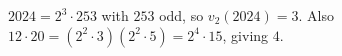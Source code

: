 $ 2024=2^3\cdot253 $ with $ 253 $ odd, so $ v_2(2024)=\boxed3 $. Also $ 12\cdot20=(2^2\cdot3)(2^2\cdot5)=2^4\cdot15 $, giving $\boxed4 $.
